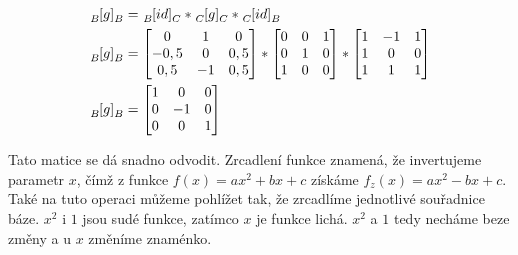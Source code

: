 \documentclass{article}
\begin{document}
\begin{align*}
    \tensor[_B]{[g]}{_B} & = \tensor[_B]{[id]}{_C} * \tensor[_C]{[g]}{_C} * \tensor[_C]{[id]}{_B} \\
    \tensor[_B]{[g]}{_B} & =
    \begin{bmatrix}
        0    & 1  & 0   \\
        -0,5 & 0  & 0,5 \\
        0,5  & -1 & 0,5
    \end{bmatrix}
    * \begin{bmatrix}
          0 & 0 & 1 \\
          0 & 1 & 0 \\
          1 & 0 & 0 \\
      \end{bmatrix}
    * \begin{bmatrix}
          1 & -1 & 1 \\
          1 & 0  & 0 \\
          1 & 1  & 1
      \end{bmatrix}                                                                              \\
    \tensor[_B]{[g]}{_B} & =
    \begin{bmatrix}
        1 & 0  & 0 \\
        0 & -1 & 0 \\
        0 & 0  & 1 \\
    \end{bmatrix}                                                                                \\
\end{align*}

Tato matice se dá snadno odvodit. Zrcadlení funkce znamená, že invertujeme parametr $x$, čímž z funkce $f(x) = ax^2 + bx + c$ získáme $f_z(x) = ax^2 - bx + c$. Také na tuto operaci můžeme pohlížet tak, že zrcadlíme jednotlivé souřadnice báze. $x^2$ i $1$ jsou sudé funkce, zatímco $x$ je funkce lichá. $x^2$ a $1$ tedy necháme beze změny a u $x$ změníme znaménko.
\end{document}
